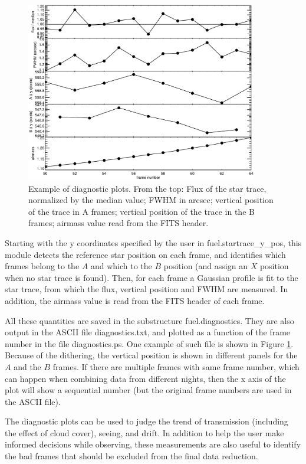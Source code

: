 \documentclass[a4paper, notitlepage]{article}
\begin{document}
\begin{figure}[htbp]
\centering
\includegraphics[width=0.9\textwidth]{diagnostics}
\caption{Example of diagnostic plots. From the top: Flux of the star trace, normalized by the median value; FWHM in arcsec; vertical position of the trace in A frames; vertical position of the trace in the B frames; airmass value read from the FITS header.}
\label{fig:diagnostics}
\end{figure}

Starting with the y coordinates specified by the user in fuel.startrace\_y\_pos, this module detects the reference star position on each frame, and identifies which frames belong to the $A$ and which to the $B$ position (and assign an $X$ position when no star trace is found). Then, for each frame a Gaussian profile is fit to the star trace, from which the flux, vertical position and FWHM are measured. In addition, the airmass value is read from the FITS header of each frame.

All these quantities are saved in the substructure fuel.diagnostics. They are also output in the ASCII file diagnostics.txt, and plotted as a function of the frame number in the file diagnostics.ps. One example of such file is shown in Figure \ref{fig:diagnostics}. Because of the dithering, the vertical position is shown in different panels for the $A$ and the $B$ frames. If there are multiple frames with same frame number, which can happen when combining data from different nights, then the x axis of the plot will show a sequential number (but the original frame numbers are used in the ASCII file).

The diagnostic plots can be used to judge the trend of transmission (including the effect of cloud cover), seeing, and drift. In addition to help the user make informed decisions while observing, these measurements are also useful to identify the bad frames that should be excluded from the final data reduction.
\end{document}
